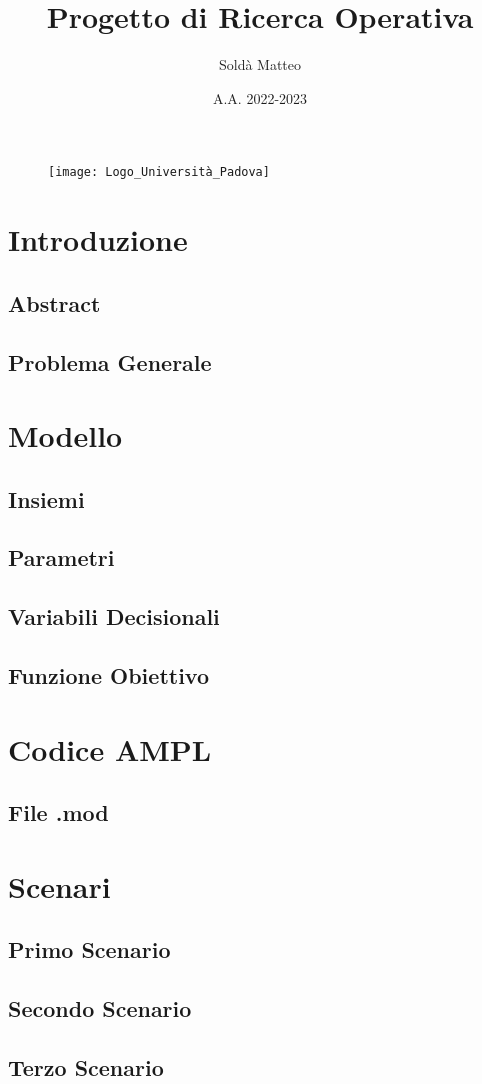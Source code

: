 \documentclass[12pt, a4paper]{article}
\title{Progetto di Ricerca Operativa}
\author{Soldà Matteo }
\date{A.A. 2022-2023}
\begin{document}
\begin{figure}
    \centering
    \texttt{[image: Logo\_Università\_Padova]}
\end{figure}

\maketitle

\newpage
\tableofcontents

\newpage
\section{Introduzione}
\subsection{Abstract}
\subsection{Problema Generale}
\newpage
\section{Modello}
\subsection{Insiemi}
\subsection{Parametri}
\subsection{Variabili Decisionali}
\subsection{Funzione Obiettivo}
\newpage
\section{Codice AMPL}
\subsection{File .mod}
\newpage
\section{Scenari}
\subsection{Primo Scenario}
\subsection{Secondo Scenario}
\subsection{Terzo Scenario}
\end{document}
